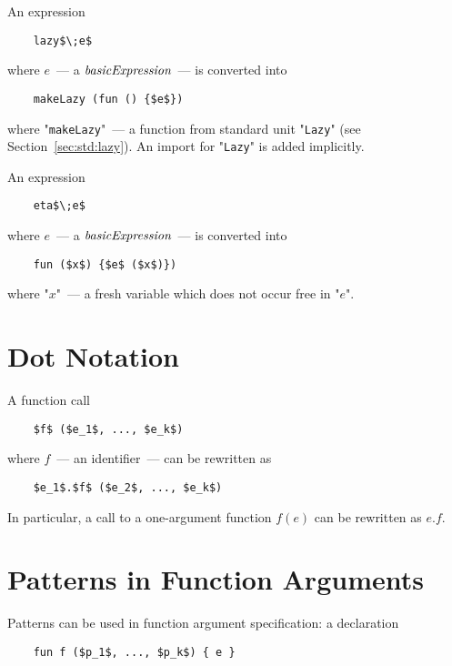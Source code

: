 An expression

\begin{lstlisting}
    lazy$\;e$
\end{lstlisting}

where $e$~--- a $\textit{basicExpression}$~--- is converted into

\begin{lstlisting}
    makeLazy (fun () {$e$})    
\end{lstlisting}

where "\lstinline|makeLazy|"~--- a function from standard unit "\lstinline|Lazy|" (see Section~\ref{sec:std:lazy}). An import for
"\lstinline|Lazy|" is added implicitly.

An expression

\begin{lstlisting}
    eta$\;e$
\end{lstlisting}

where $e$~--- a $\textit{basicExpression}$~--- is converted into

\begin{lstlisting}
    fun ($x$) {$e$ ($x$)})    
\end{lstlisting}

where "$x$"~--- a fresh variable which does not occur free in "$e$".

\section{Dot Notation}

A function call

\begin{lstlisting}
    $f$ ($e_1$, ..., $e_k$)
\end{lstlisting}

where $f$~--- an identifier~--- can be rewritten as

\begin{lstlisting}
    $e_1$.$f$ ($e_2$, ..., $e_k$)
\end{lstlisting}

In particular, a call to a one-argument function $f (e)$ can be rewritten as $e.f$.

\section{Patterns in Function Arguments}

Patterns can be used in function argument specification: a declaration

\begin{lstlisting}
    fun f ($p_1$, ..., $p_k$) { e }
\end{lstlisting}


